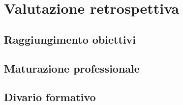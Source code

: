 \chapter{Valutazione retrospettiva}
\label{cap:valutazioneRetrospettiva}

\section{Raggiungimento obiettivi}
%

\section{Maturazione professionale}
%

\section{Divario formativo}
%

